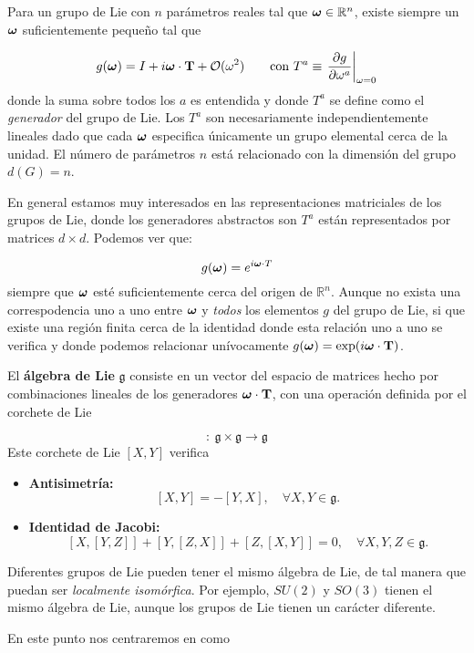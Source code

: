 Para un grupo de Lie con $n$ parámetros reales tal que $\boldsymbol{\omega} \in \mathbb{R}^n$, existe siempre un $\boldsymbol{\omega}$ suficientemente pequeño tal que

\begin{equation}
	g(\omegan) = I + i \omegan \cdot \Tn + \Ocal (\omega^2) \qquad \text{con} \ T^a \equiv \eval{\parciales{g}{\omega^a}}_{\omega=0}
\end{equation}
donde la suma sobre todos los $a$ es entendida y donde $T^a$ se define como el \textit{generador} del grupo de Lie. Los $T^a$ son necesariamente independientemente lineales dado que cada $\boldsymbol{\omega}$ especifica únicamente un grupo elemental cerca de la unidad. El número de parámetros $n$ está relacionado con la dimensión del grupo $d(G)=n$.

En general estamos muy interesados en las representaciones matriciales de los grupos de Lie, donde los generadores abstractos son $T^a$ están representados por matrices $d\times d$. Podemos ver que:

\begin{equation}
	g(\boldsymbol{\omega}) = e^{i \boldsymbol{\omega} \cdot T}
\end{equation}
siempre que $\boldsymbol{\omega}$ esté suficientemente cerca del origen de $\mathbb{R}^n$. Aunque no exista una correspodencia uno a uno entre $\boldsymbol{\omega}$ y \textit{todos} los elementos $g$ del grupo de Lie, si que existe una región finita cerca de la identidad donde esta relación uno a uno se verifica y donde podemos relacionar unívocamente $g(\boldsymbol{\omega})=\exp (i \boldsymbol{\omega} \cdot \mathbf{T})$.

El \textbf{álgebra de Lie} $\mathfrak{g}$ consiste en un vector del espacio de matrices hecho por combinaciones lineales de los generadores $\boldsymbol{\omega} \cdot \mathbf{T}$, con una operación definida por el corchete de Lie 

\begin{equation*}
	[\cdot,\cdot]: \ \mathfrak{g} \times \mathfrak{g} \rightarrow \mathfrak{g}
\end{equation*}
Este corchete de Lie $[X,Y]$ verifica 
\begin{itemize}
	\item \textbf{Antisimetría:} 
	\[
	[X, Y] = -[Y, X], \quad \forall X, Y \in \mathfrak{g}.
	\]
	\item \textbf{Identidad de Jacobi:}
	\[
	[X, [Y, Z]] + [Y, [Z, X]] + [Z, [X, Y]] = 0, \quad \forall X, Y, Z \in \mathfrak{g}.
	\]
\end{itemize}

Diferentes grupos de Lie pueden tener el mismo álgebra de Lie, de tal manera que puedan ser \textit{localmente isomórfica}. Por ejemplo, $SU(2)$ y $SO(3)$ tienen el mismo álgebra de Lie, aunque los grupos de Lie tienen un carácter diferente.  

En este punto nos centraremos en como 





